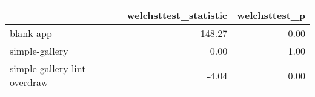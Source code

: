 \begin{tabular}{lrr}
\toprule
{} &  welchsttest\_statistic &  welchsttest\_p \\
\midrule
blank-app                    &                 148.27 &           0.00 \\
simple-gallery               &                   0.00 &           1.00 \\
simple-gallery-lint-overdraw &                  -4.04 &           0.00 \\
\bottomrule
\end{tabular}
